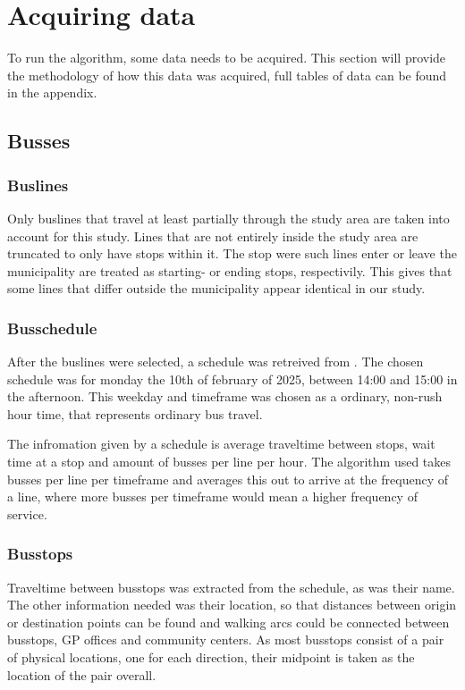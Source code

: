 \section{Acquiring data}\label{sec:acquiringdata}
To run the algorithm, some data needs to be acquired. This section will provide the methodology of how this data was acquired, full tables of data can be found in the appendix.
\subsection{Busses}

\subsubsection{Buslines}
Only buslines that travel at least partially through the study area are taken into account for this study. Lines that are not entirely inside the study area are truncated to only have stops within it. The stop were such lines enter or leave the municipality are treated as starting- or ending stops, respectivily. This gives that some lines that differ outside the municipality appear identical in our study.
\subsubsection{Busschedule}
After the buslines were selected, a schedule was retreived from \cite{Qbuzz}. The chosen schedule was for monday the 10th of february of 2025, between 14:00 and 15:00 in the afternoon. This weekday and timeframe was chosen as a ordinary, non-rush hour time, that represents ordinary bus travel.

The infromation given by a schedule is average traveltime between stops, wait time at a stop and amount of busses per line per hour. The algorithm used takes busses per line per timeframe and averages this out to arrive at the frequency of a line, where more busses per timeframe would mean a higher frequency of service.

\subsubsection{Busstops}
Traveltime between busstops was extracted from the schedule, as was their name. The other information needed was their location, so that distances between origin or destination points can be found and walking arcs could be connected between busstops, GP offices and community centers. As most busstops consist of a pair of physical locations, one for each direction, their midpoint is taken as the location of the pair overall.

